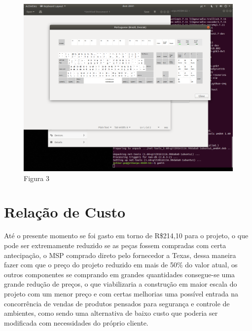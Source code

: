 \documentclass[conference,compsoc]{IEEEtran}
\begin{document}
\begin{figure}[!ht]
		\centering
		\includegraphics[scale=0.15]{nome_da_figura3.png}
		\caption{Figura 3}
\end{figure}


\section{Relação de Custo}
Até o presente momento se foi gasto em torno de R\$214,10 para o projeto, o que pode ser extremamente reduzido se as peças fossem compradas com certa antecipação, o MSP comprado direto pelo fornecedor a Texas, dessa maneira fazer com que o preço do projeto reduzido em mais de 50\% do valor atual, os outros componentes se comprando em grandes quantidades consegue-se uma grande redução de preços, o que viabilizaria a construção em maior escala do projeto com um menor preço e com certas melhorias uma possível entrada na concorrência de vendas de produtos pensados para segurança e controle de ambientes, como sendo uma alternativa de baixo custo que poderia ser modificada com necessidades do próprio cliente.







\end{document}
